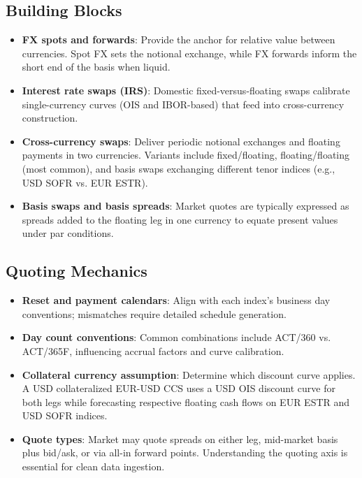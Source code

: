 \documentclass[11pt]{article}
\begin{document}
\subsection{Building Blocks}
\begin{itemize}[leftmargin=*]
  \item \textbf{FX spots and forwards}: Provide the anchor for relative value between currencies. Spot FX sets the notional exchange, while FX forwards inform the short end of the basis when liquid.
  \item \textbf{Interest rate swaps (IRS)}: Domestic fixed-versus-floating swaps calibrate single-currency curves (OIS and IBOR-based) that feed into cross-currency construction.
  \item \textbf{Cross-currency swaps}: Deliver periodic notional exchanges and floating payments in two currencies. Variants include fixed/floating, floating/floating (most common), and basis swaps exchanging different tenor indices (e.g., USD SOFR vs. EUR ESTR).
  \item \textbf{Basis swaps and basis spreads}: Market quotes are typically expressed as spreads added to the floating leg in one currency to equate present values under par conditions.
\end{itemize}

\subsection{Quoting Mechanics}
\begin{itemize}[leftmargin=*]
  \item \textbf{Reset and payment calendars}: Align with each index's business day conventions; mismatches require detailed schedule generation.
  \item \textbf{Day count conventions}: Common combinations include ACT/360 vs. ACT/365F, influencing accrual factors and curve calibration.
  \item \textbf{Collateral currency assumption}: Determine which discount curve applies. A USD collateralized EUR-USD CCS uses a USD OIS discount curve for both legs while forecasting respective floating cash flows on EUR ESTR and USD SOFR indices.
  \item \textbf{Quote types}: Market may quote spreads on either leg, mid-market basis plus bid/ask, or via all-in forward points. Understanding the quoting axis is essential for clean data ingestion.
\end{itemize}
\end{document}
